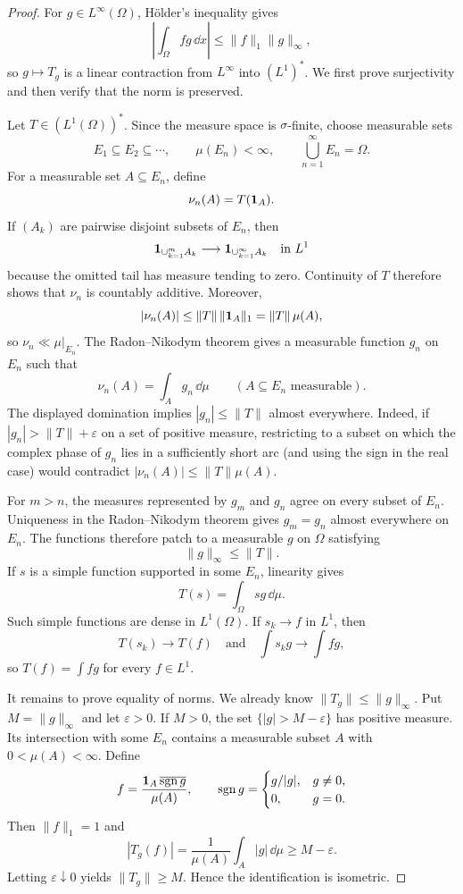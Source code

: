 \begin{proof}
For $g\in L^\infty(\Omega)$, Hölder's inequality gives
\[
  \left|\int_\Omega fg\,\dd x\right|
  \le\|f\|_1\|g\|_\infty,
\]
so $g\mapsto T_g$ is a linear contraction from $L^\infty$ into $(L^1)^*$.
We first prove surjectivity and then verify that the norm is preserved.

Let $T\in(L^1(\Omega))^*$.  Since the measure space is $\sigma$-finite, choose
measurable sets
\[
  E_1\subseteq E_2\subseteq\cdots,
  \qquad \mu(E_n)<\infty,
  \qquad \bigcup_{n=1}^\infty E_n=\Omega.
\]
For a measurable set $A\subseteq E_n$, define
\[
  \nu_n(A)=T(\mathbf{1}_A).
\]
If $(A_k)$ are pairwise disjoint subsets of $E_n$, then
\[
  \mathbf{1}_{\cup_{k=1}^m A_k}\longrightarrow
  \mathbf{1}_{\cup_{k=1}^\infty A_k}
  \quad\text{in }L^1
\]
because the omitted tail has measure tending to zero.  Continuity of $T$
therefore shows that $\nu_n$ is countably additive.  Moreover,
\[
  |\nu_n(A)|\le\|T\|\,\|\mathbf{1}_A\|_1
  =\|T\|\,\mu(A),
\]
so $\nu_n\ll\mu|_{E_n}$.  The Radon--Nikodym theorem gives a measurable
function $g_n$ on $E_n$ such that
\[
  \nu_n(A)=\int_A g_n\,\dd\mu
  \qquad(A\subseteq E_n\text{ measurable}).
\]
The displayed domination implies $|g_n|\le\|T\|$ almost everywhere.  Indeed,
if $|g_n|>\|T\|+\varepsilon$ on a set of positive measure, restricting to a
subset on which the complex phase of $g_n$ lies in a sufficiently short arc
(and using the sign in the real case) would contradict
$|\nu_n(A)|\le\|T\|\mu(A)$.

For $m>n$, the measures represented by $g_m$ and $g_n$ agree on every subset
of $E_n$.  Uniqueness in the Radon--Nikodym theorem gives
$g_m=g_n$ almost everywhere on $E_n$.  The functions therefore patch to a
measurable $g$ on $\Omega$ satisfying
\[
  \|g\|_\infty\le\|T\|.
\]
If $s$ is a simple function supported in some $E_n$, linearity gives
\[
  T(s)=\int_\Omega sg\,\dd\mu.
\]
Such simple functions are dense in $L^1(\Omega)$.  If $s_k\to f$ in $L^1$,
then
\[
  T(s_k)\to T(f)
  \quad\text{and}\quad
  \int s_kg\to\int fg,
\]
so $T(f)=\int fg$ for every $f\in L^1$.

It remains to prove equality of norms.  We already know
$\|T_g\|\le\|g\|_\infty$.  Put $M=\|g\|_\infty$ and let $\varepsilon>0$.
If $M>0$, the set $\{|g|>M-\varepsilon\}$ has positive measure.  Its
intersection with some $E_n$ contains a measurable subset $A$ with
$0<\mu(A)<\infty$.  Define
\[
  f=\frac{\mathbf{1}_A\,\overline{\operatorname{sgn}g}}{\mu(A)},
  \qquad
  \operatorname{sgn}g=
  \begin{cases}g/|g|,&g\ne0,\\0,&g=0.\end{cases}
\]
Then $\|f\|_1=1$ and
\[
  |T_g(f)|
  =\frac1{\mu(A)}\int_A|g|\,\dd\mu
  \ge M-\varepsilon.
\]
Letting $\varepsilon\downarrow0$ yields $\|T_g\|\ge M$.  Hence the
identification is isometric.
\end{proof}

